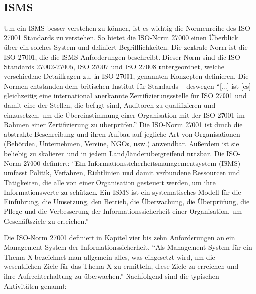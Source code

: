 \subsection{\ac{ISMS}}\label{kap:ISMS}
Um ein \ac{ISMS} besser verstehen zu können, ist es wichtig die Normenreihe des ISO 27001 Standards zu verstehen. So bietet die ISO-Norm 27000 einen Überblick über ein solches System und definiert Begrifflichkeiten. Die zentrale Norm ist die ISO 27001, die die \ac{ISMS}-Anforderungen beschreibt.\autocite[vgl.][]{dindeutsches_institut_fur_normung_informationstechnik_2020} Dieser Norm sind die ISO-Standards 27002-27005, ISO 27007 und ISO 27008 untergeordnet, welche verschiedene Detailfragen zu, in ISO 27001, genannten Konzepten definieren. Die Normen entstanden dem britischen Institut für Standards -- deswegen \enquote{[...] ist [es] gleichzeitig eine international anerkannte Zertifizierungsstelle für ISO 27001 und damit eine der Stellen, die befugt sind, Auditoren zu qualifizieren und einzusetzen, um die Übereinstimmung einer Organisation mit der ISO 27001 im Rahmen einer Zertifizierung zu überprüfen.}\autocite[vgl.][S.2]{kersten_it-sicherheitsmanagement_2020} Die ISO-Norm 27001 ist durch die abstrakte Beschreibung und ihren Aufbau auf jegliche Art von Organisationen (Behörden, Unternehmen, Vereine, \ac{NGOs}, usw.) anwendbar. Außerdem ist sie beliebig zu skalieren und in jedem Land/länderübergreifend nutzbar.\autocite[vgl.][S.4]{kersten_it-sicherheitsmanagement_2020} Die ISO-Norm 27000 definiert: \enquote{Ein Informationssicherheitsmanagementsystem (ISMS) umfasst Politik, Verfahren, Richtlinien und damit verbundene Ressourcen und Tätigkeiten,   die alle von einer Organisation gesteuert werden, um ihre Informationswerte zu  schützen. Ein ISMS ist ein systematisches Modell für die Einführung, die Umsetzung,  den Betrieb, die Überwachung, die Überprüfung, die Pflege und die Verbesserung der Informationssicherheit einer Organisation, um Geschäftsziele zu erreichen.}\autocite[][S.20]{dindeutsches_institut_fur_normung_informationstechnik_2019}
\par
Die ISO-Norm 27001 definiert in Kapitel vier bis zehn Anforderungen an ein Management-System der Informationssicherheit.\autocite[vgl.][S.6-16]{dindeutsches_institut_fur_normung_informationstechnik_2020} \enquote{Als Management-System für ein Thema X bezeichnet man allgemein alles, was eingesetzt wird, um die wesentlichen Ziele für das Thema X zu ermitteln, diese Ziele zu erreichen und ihre Aufrechterhaltung zu überwachen.}\autocite[][S.5]{kersten_it-sicherheitsmanagement_2020} Nachfolgend sind die typischen Aktivitäten genannt\autocite[][S.5]{kersten_it-sicherheitsmanagement_2020}:
